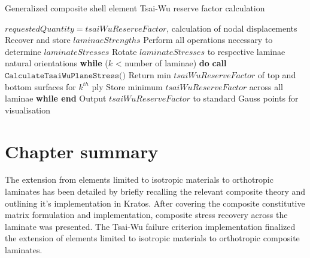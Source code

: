 \begin{algorithm}
	\onehalfspacing
	\caption{Generalized composite shell element Tsai-Wu reserve factor calculation}
	\label{general composite shell tsai pseudocode}
	\begin{algorithmic}[1]
		\Require $requestedQuantity = tsaiWuReserveFactor$, calculation of nodal displacements
		\State Recover and store $laminaeStrengths$
		\State Perform all operations necessary to determine $laminateStresses$
		\State Rotate $laminateStresses$ to respective laminae natural orientations
		\State \hspace{\algorithmicindent}\textbf{while} ($k$ < number of laminae) \textbf{do}
		\State \hspace{\algorithmicindent}\hspace{\algorithmicindent}\textbf{call} $\texttt{CalculateTsaiWuPlaneStress()}$
		\State \hspace{\algorithmicindent}\hspace{\algorithmicindent}\hspace{\algorithmicindent}Return min $tsaiWuReserveFactor$ of top and bottom surfaces for $k^{th}$ ply
		\State \hspace{\algorithmicindent} \hspace{\algorithmicindent}Store minimum $tsaiWuReserveFactor$ across all laminae
		\State \hspace{\algorithmicindent}\textbf{while end}
		\State Output $tsaiWuReserveFactor$ to standard Gauss points for visualisation
		\EndWhile
	\end{algorithmic}
\end{algorithm}

\section{Chapter summary}
The extension from elements limited to isotropic materials to orthotropic laminates has been detailed by briefly recalling the relevant composite theory and outlining it's implementation in Kratos. After covering the composite constitutive matrix formulation and implementation, composite stress recovery across the laminate was presented. The Tsai-Wu failure criterion implementation finalized the extension of elements limited to isotropic materials to orthotropic composite laminates.